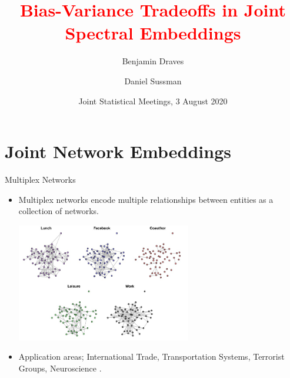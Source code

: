 \documentclass[handout]{beamer}
\title{\textcolor{red}{Bias-Variance Tradeoffs in Joint Spectral Embeddings}}
\author[Benjamin Draves]{Benjamin Draves \and Daniel Sussman}
\institute[Boston Univeristy] 
{\normalsize Boston University}
\date{Joint Statistical Meetings, 3 August 2020}
\begin{document}
\begin{frame}
  \titlepage
\end{frame}

\section{Joint Network Embeddings}

\begin{frame}{Multiplex Networks}
\begin{itemize}
    \item Multiplex networks encode multiple relationships between entities as a collection of networks. 
    \begin{center}
        \includegraphics[width=0.6\textwidth]{aarhus_multiplex.jpg}
    \end{center}\pause
    \item Application areas; International Trade, Transportation Systems, Terrorist Groups, Neuroscience \parencite{Kivela2014}. 
\end{itemize}
\end{frame}
\end{document}
